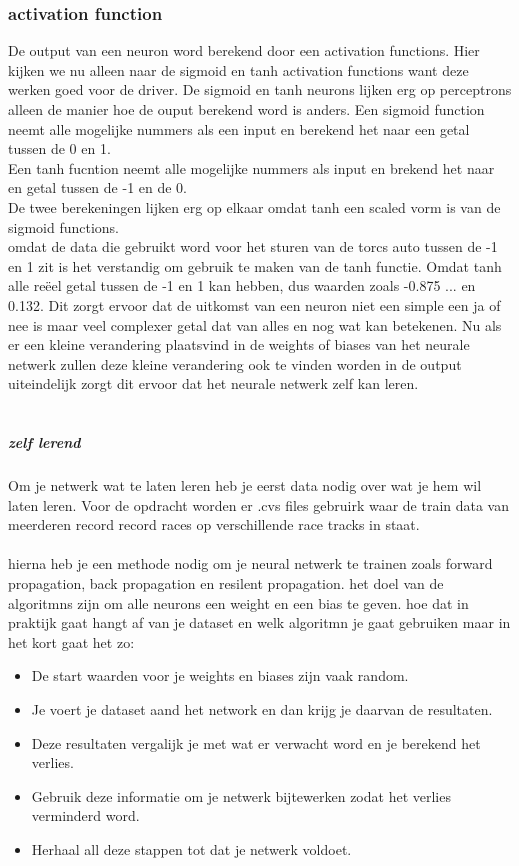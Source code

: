 \subsubsection{activation function}
De output van een neuron word berekend door een activation functions. Hier kijken we nu alleen naar de sigmoid en tanh activation functions want deze werken goed voor de driver. %
De sigmoid en tanh neurons lijken erg op perceptrons alleen de manier hoe de ouput berekend word is anders. Een sigmoid function neemt alle mogelijke nummers als een input en berekend het naar een getal tussen de 0 en 1.\\
Een tanh fucntion neemt alle mogelijke nummers als input en brekend het naar en getal tussen de -1 en de 0.\\
De twee berekeningen lijken erg op elkaar omdat tanh een scaled vorm is van de sigmoid functions.\\ \cite{learning}\cite{NeuralNetwork1}
omdat de data die gebruikt word voor het sturen van de torcs auto tussen de -1 en 1 zit is het verstandig om gebruik te maken van de tanh functie. Omdat tanh alle reëel getal tussen de -1 en 1 kan hebben, dus waarden zoals -0.875 ... en 0.132. Dit zorgt ervoor dat de uitkomst van een neuron niet een simple een ja of nee is maar veel complexer getal dat van alles en nog wat kan betekenen. Nu als er een kleine verandering plaatsvind in de weights of biases van het neurale netwerk zullen deze kleine verandering ook te vinden worden in de output uiteindelijk zorgt dit ervoor dat het neurale netwerk zelf kan leren.\\\\
\subparagraph{zelf lerend}
Om je netwerk wat te laten leren heb je eerst data nodig over wat je hem wil laten leren. Voor de opdracht worden er .cvs files gebruirk waar de train data van meerderen record record races op verschillende race tracks in staat.\\\\
\noindent hierna heb je een methode nodig om je neural netwerk te trainen zoals forward propagation, back propagation en resilent propagation. het doel van de algoritmns zijn om alle neurons een weight en een bias te geven. hoe dat in praktijk gaat hangt af van je dataset en welk algoritmn je gaat gebruiken maar in het kort gaat het zo:
\begin{itemize}
\item De start waarden voor je weights en biases zijn vaak random.
\item Je voert je dataset aand het network en dan krijg je daarvan de resultaten.
\item Deze resultaten vergalijk je met wat er verwacht word en je berekend het verlies.
\item Gebruik deze informatie om je netwerk bijtewerken zodat het verlies verminderd word.
\item Herhaal all deze stappen tot dat je netwerk voldoet.
\end{itemize}\cite{learning}

